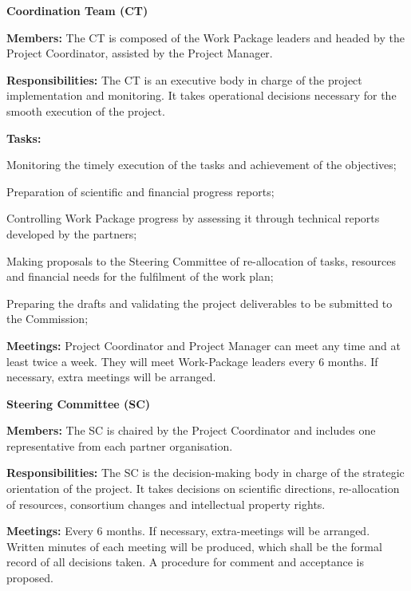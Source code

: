 \begin{description}
\item{\textbf{Coordination Team (CT)}} \nobreak\par
\textbf{Members:} The CT is composed of the Work Package leaders
and headed by the Project Coordinator, assisted by the Project
Manager.

\textbf{Responsibilities:} The CT is an executive body in charge of
the project implementation and monitoring.
It takes operational decisions necessary for the smooth execution of
the project.

\textbf{Tasks:}
\begin{compactenum} 
\item Monitoring the timely execution of the tasks and achievement of
  the objectives;
\item Preparation of scientific and financial progress reports;
\item Controlling Work Package progress by assessing it through technical
  reports developed by the partners;
\item Making proposals to the Steering Committee of re-allocation of
  tasks, resources and financial needs for the fulfilment of the work
  plan;
\item Preparing the drafts and validating the project deliverables to
  be submitted to the Commission; 
\end{compactenum} 

\textbf{Meetings:} Project Coordinator and
  Project Manager can meet any time and at least twice a week. They
  will meet Work-Package leaders every 6 months. If necessary,
  extra meetings will be arranged.



\item{\textbf{Steering Committee (SC)}}\nobreak\par

\textbf{Members:} The SC is chaired by the Project Coordinator
and includes one representative from each partner organisation.

\textbf{Responsibilities:} The SC is the decision-making body in
charge of the strategic orientation of the project.  It takes decisions on scientific
directions, re-allocation of resources, consortium
changes and intellectual property rights.

\textbf{Meetings:} Every 6 months. If necessary, extra-meetings
will be arranged.  Written minutes of each meeting will be produced,
which shall be the formal record of all decisions taken. A procedure
for comment and acceptance is proposed.


\end{description}
